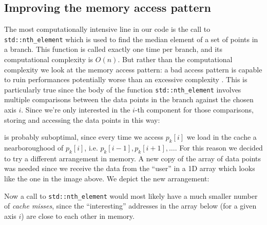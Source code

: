 \documentclass{article}
\begin{document}
\subsection{Improving the memory access pattern} \label{sec:mem_acc_pattern}
The most computationally intensive line in our code is the call to
\texttt{std::nth\_element} which is used to find the median element of a set of
points in a branch. This function is called exactly one time per branch, and its
computational complexity is $O(n)$. But rather than the computational complexity
we look at the memory access pattern: a bad access pattern is capable to ruin
performances potentially worse than an excessive complexity
\cite{hager2010introduction}. This is particularly true since the body of the
function \texttt{std::nth\_element} involves multiple comparisons between the
data points in the branch against the chosen axis $i$. Since we're only
interested in the $i$-th component for those comparisons, storing and accessing
the data points in this way:
\begin{figure}[H]
    \centering
\end{figure}
is probably suboptimal, since every time we access $p_k[i]$ we load in the cache
a nearboroughood of $p_k[i]$, i.e. $p_k[i-1], p_k[i+1], \dots$.
For this reason we decided to try a different arrangement in memory. A new
copy of the array of data points was needed since we receive the data from the
``user'' in a 1D array which looks like the one in the image above. We depict
the new arrangement:
\begin{figure}[H]
    \centering
\end{figure}
Now a call to \texttt{std::nth\_element} would most likely have a much smaller
number of \emph{cache misses}, since the ``interesting'' addresses in the array
below (for a given axis $i$) are close to each other in memory.
\end{document}
